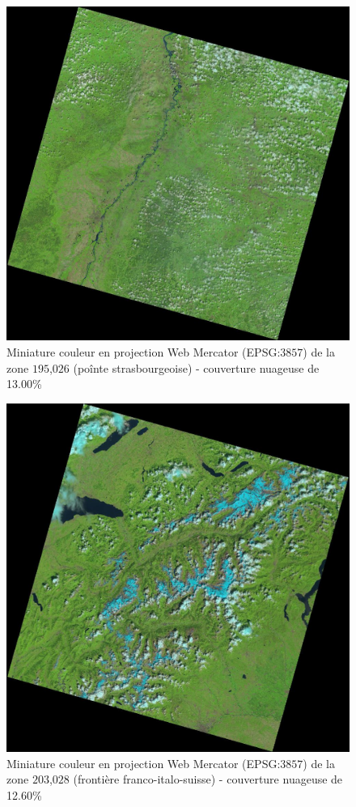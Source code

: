 \documentclass{book}
\begin{document}
\begin{figure}[H]
\begin{center}
\includegraphics[scale=0.18]{images/LC81950262013156LGN00.jpg}
\end{center}
\caption{Miniature couleur en projection Web Mercator (EPSG:$3857$) de la zone $195$,$026$ (poînte strasbourgeoise) - couverture nuageuse de 13.00\%}
\label{cloud4}
\end{figure}

\begin{figure}[H]
\begin{center}
\includegraphics[scale=0.18]{images/LC81950282013204LGN00.jpg}
\end{center}
\caption{Miniature couleur en projection Web Mercator (EPSG:$3857$) de la zone $203$,$028$ (frontière franco-italo-suisse) - couverture nuageuse de 12.60\%}
\label{cloud5}
\end{figure}
\end{document}
